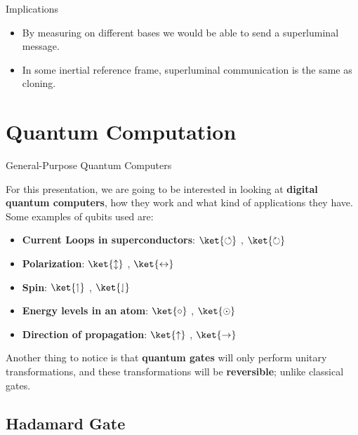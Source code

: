 \documentclass[9pt, handout, aspectratio=169]{beamer}		%
\begin{document}
\begin{frame}{Implications}
		\pause

		\begin{itemize}
		\item By measuring on different bases we would be able to send a superluminal message. \pause
		\item In some inertial reference frame, superluminal communication is the same as cloning.
		\end{itemize}

	\end{frame}


\section{Quantum Computation}

	\begin{frame}{General-Purpose Quantum Computers}

		For this presentation, we are going to be interested in looking at \textbf{digital quantum computers}, how they work and what kind of applications they have. Some examples of qubits used are:

		\pause
		\vspace{8pt}
		\begin{itemize}
			\item \textbf{Current Loops in superconductors}: $\ket{\circlearrowleft}$ , $\ket{\circlearrowright}$
			\item \textbf{Polarization}: $\ket{\updownarrow}$ , $\ket{\leftrightarrow}$
			\item \textbf{Spin}: $\ket{\upharpoonleft}$ , $\ket{\downharpoonleft}$
			\item \textbf{Energy levels in an atom}: $\ket{\circ}$ , $\ket{\odot}$
			\item \textbf{Direction of propagation}: $\ket{\uparrow}$ , $\ket{\rightarrow}$
		\end{itemize}

		\pause
		\vspace{8pt}
		Another thing to notice is that \textbf{quantum gates} will only perform unitary transformations, and these transformations will be \textbf{reversible}; unlike classical gates.

	\end{frame}


	\subsection{Hadamard Gate}
\end{document}
